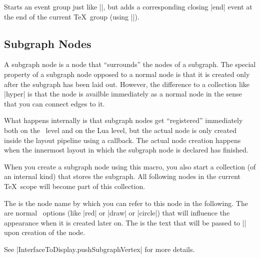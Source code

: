 \begin{command}{\pgfgdeventgroup{}}
  Starts an event group just like |\pgfgdbegineventgroup|, but adds a
  corresponding closing |end| event at the end of the current \TeX\
  group (using |\aftergroup|).
\end{command}


\subsection{Subgraph Nodes}

\begin{command}{\pgfgdsubgraphnode{}}
  A subgraph node is a node that ``surrounds'' the nodes of a
  subgraph. The special property of a subgraph node opposed to a
  normal node is that it is created only after the subgraph has been
  laid out. However, the difference to a collection like |hyper| is
  that the node is availble immediately as a normal node in the sense
  that you can connect edges to it.
  
  What happens internally is that subgraph nodes get ``registered''
  immediately both on the \pgfname\ level and on the Lua level, but the
  actual node is only created inside the layout pipeline using a
  callback. The actual node creation happens when the innermost layout
  in which the subgraph node is declared has finished.
  
  When you create a subgraph node using this macro, you also start a
  collection (of an internal kind) that stores the subgraph. All
  following nodes in the current \TeX\ scope will become part of this
  collection.

  The  is the node name by which you can refer to this node
  in the following. The \meta{node options} are normal \pgfname\
  options (like |red| or |draw| or |circle|) that will influence the
  appearance when it is created later on. The \meta{node text} is the
  text that will be passed to |\pgfnode| upon creation of the node.
  
  See |InterfaceToDisplay.pushSubgraphVertex| for more details.
\end{command}





